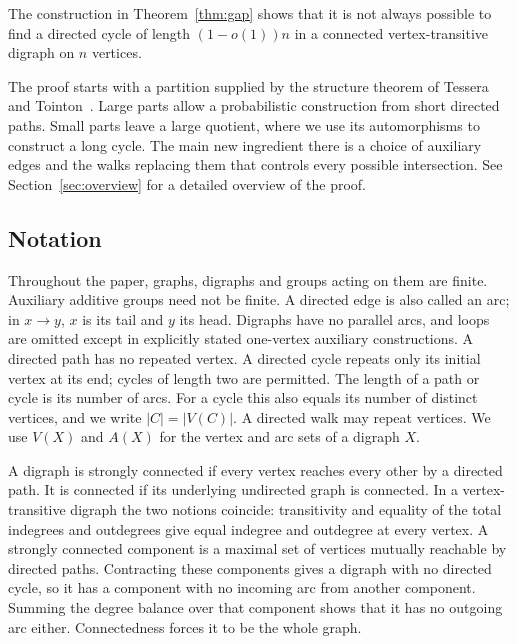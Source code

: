 \documentclass[11pt,a4paper,reqno]{amsart}
\theoremstyle{definition}
\theoremstyle{remark}
\numberwithin{equation}{section}
\begin{document}
The construction in Theorem~\ref{thm:gap} shows that it is not always possible to find a directed cycle of length $(1-o(1))n$ in a connected vertex-transitive digraph on $n$ vertices.

The proof starts with a partition supplied by the structure theorem of Tessera and Tointon~\cite{TT}. Large parts allow a probabilistic construction from short directed paths. Small parts leave a large quotient, where we use its automorphisms to construct a long cycle. The main new ingredient there is a choice of auxiliary edges and the walks replacing them that controls every possible intersection. See Section~\ref{sec:overview} for a detailed overview of the proof.

\subsection{Notation}
Throughout the paper, graphs, digraphs and groups acting on them are finite. Auxiliary additive groups need not be finite. A directed edge is also called an arc; in $x\to y$, $x$ is its tail and $y$ its head. Digraphs have no parallel arcs, and loops are omitted except in explicitly stated one-vertex auxiliary constructions. A directed path has no repeated vertex. A directed cycle repeats only its initial vertex at its end; cycles of length two are permitted. The length of a path or cycle is its number of arcs. For a cycle this also equals its number of distinct vertices, and we write $|C|=|V(C)|$. A directed walk may repeat vertices. We use $V(X)$ and $A(X)$ for the vertex and arc sets of a digraph $X$.

A digraph is strongly connected if every vertex reaches every other by a directed path. It is connected if its underlying undirected graph is connected. In a vertex-transitive digraph the two notions coincide: transitivity and equality of the total indegrees and outdegrees give equal indegree and outdegree at every vertex. A strongly connected component is a maximal set of vertices mutually reachable by directed paths. Contracting these components gives a digraph with no directed cycle, so it has a component with no incoming arc from another component. Summing the degree balance over that component shows that it has no outgoing arc either. Connectedness forces it to be the whole graph.
\end{document}
